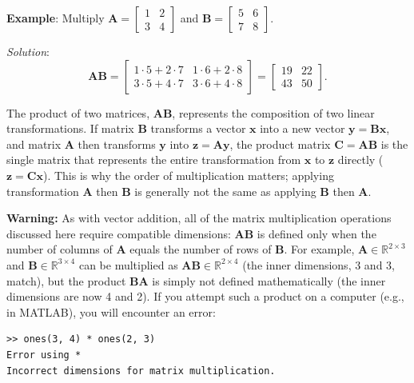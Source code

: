 \begin{exampleBox}
    \textbf{Example}: Multiply $ \mathbf{A} = \begin{bmatrix}1 & 2\\3 & 4\end{bmatrix} $ and $ \mathbf{B} = \begin{bmatrix}5 & 6\\7 & 8\end{bmatrix} $.

    \emph{Solution}:
    \begin{equation*}
        \mathbf{A}\mathbf{B} = \begin{bmatrix}
            1 \cdot 5 + 2 \cdot 7 & 1 \cdot 6 + 2 \cdot 8 \\
            3 \cdot 5 + 4 \cdot 7 & 3 \cdot 6 + 4 \cdot 8
        \end{bmatrix} = \begin{bmatrix}19 & 22 \\ 43 & 50\end{bmatrix}.
    \end{equation*}
\end{exampleBox}

The product of two matrices, $ \mathbf{A}\mathbf{B} $, represents the composition of two linear transformations. If matrix $ \mathbf{B} $ transforms a vector $ \mathbf{x} $ into a new vector $ \mathbf{y} = \mathbf{B}\mathbf{x} $, and matrix $ \mathbf{A} $ then transforms $ \mathbf{y} $ into $ \mathbf{z} = \mathbf{A}\mathbf{y} $, the product matrix $ \mathbf{C} = \mathbf{A}\mathbf{B} $ is the single matrix that represents the entire transformation from $ \mathbf{x} $ to $ \mathbf{z} $ directly ($ \mathbf{z} = \mathbf{C}\mathbf{x} $). This is why the order of multiplication matters; applying transformation $ \mathbf{A} $ then $ \mathbf{B} $ is generally not the same as applying $ \mathbf{B} $ then $ \mathbf{A} $.

\begin{warningBox}
    \textbf{Warning:} As with vector addition, all of the matrix multiplication operations discussed here require compatible dimensions: $ \mathbf{A}\mathbf{B} $ is defined only when the number of columns of $ \mathbf{A} $ equals the number of rows of $ \mathbf{B} $. For example, $ \mathbf{A} \in \mathbb{R}^{2 \times 3} $ and $ \mathbf{B} \in \mathbb{R}^{3 \times 4} $ can be multiplied as $ \mathbf{A}\mathbf{B} \in \mathbb{R}^{2 \times 4} $ (the inner dimensions, 3 and 3, match), but the product $ \mathbf{B}\mathbf{A} $ is simply not defined mathematically (the inner dimensions are now 4 and 2). If you attempt such a product on a computer (e.g., in MATLAB), you will encounter an error:
\begin{verbatim}
>> ones(3, 4) * ones(2, 3)
Error using *
Incorrect dimensions for matrix multiplication.
\end{verbatim}
\end{warningBox}

